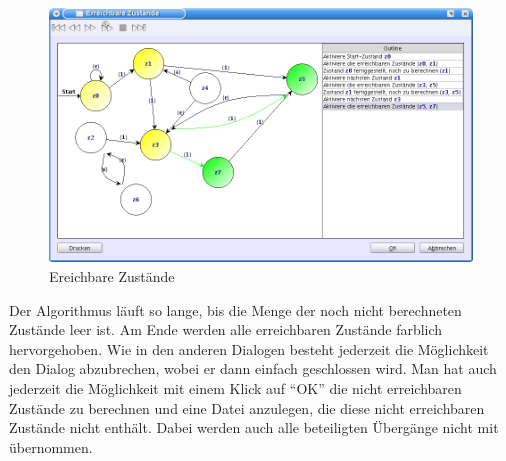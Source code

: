 \begin{figure}[h]
\begin{center}
\includegraphics[width=12cm]{images/reachable_states.png}
\caption{Ereichbare Zustände}
\end{center}
\end{figure}

Der Algorithmus läuft so lange, bis die Menge der noch nicht berechneten Zustände
leer ist. Am Ende werden alle erreichbaren Zustände farblich hervorgehoben. Wie
in den anderen Dialogen besteht jederzeit die Möglichkeit den Dialog abzubrechen,
wobei er dann einfach geschlossen wird. Man hat auch jederzeit die Möglichkeit
mit einem Klick auf "`OK"' die nicht erreichbaren Zustände zu berechnen und eine
Datei anzulegen, die diese nicht erreichbaren Zustände nicht enthält. Dabei
werden auch alle beteiligten Übergänge nicht mit übernommen.
